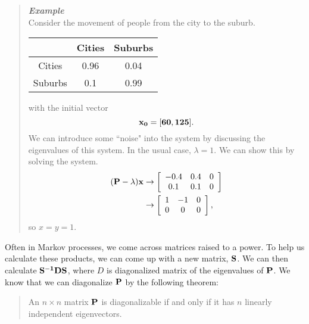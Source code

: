 \documentclass{hw}
\begin{document}
\begin{quote}
\textit{\textbf{Example}}\\
Consider the movement of people from the city to the suburb.
\begin{center}
\begin{tabular}{c | c c}
& Cities & Suburbs\\
\hline
Cities & 0.96 & 0.04\\
Suburbs & 0.1 & 0.99
\end{tabular}
\end{center}
with the initial vector
\[
\bf{x}_{0}=[60,125].
\]
We can introduce some ``noise" into the system by discussing the eigenvalues of this system. In the
usual case, $\lambda=1$. We can show this by solving the system.
\begin{align*}
(\bf{P}-\lambda)\bf{x}&\to
\left[
\begin{array}{c c c}
-0.4 & 0.4 & 0\\
0.1 & 0.1 & 0
\end{array}
\right]\\
&\to
\left[
\begin{array}{c c c}
1 & -1 & 0\\
0 & 0  & 0
\end{array}
\right],
\end{align*}
so $x=y=1$.
\end{quote}

Often in Markov processes, we come across matrices raised to a power. To help us calculate these
products, we can come up with a new matrix, $\bf{S}$. We can then calculate
$\bf{S}^{-1}\bf{D}\bf{S}$, where $D$ is diagonalized matrix of the eigenvalues of $\bf{P}$. We know
that we can diagonalize $\bf{P}$ by the following theorem:
\begin{quote}
An $n\times n$ matrix $\bf{P}$ is diagonalizable if and only if it has $n$ linearly independent
eigenvectors.  
\end{quote}
\end{document}
